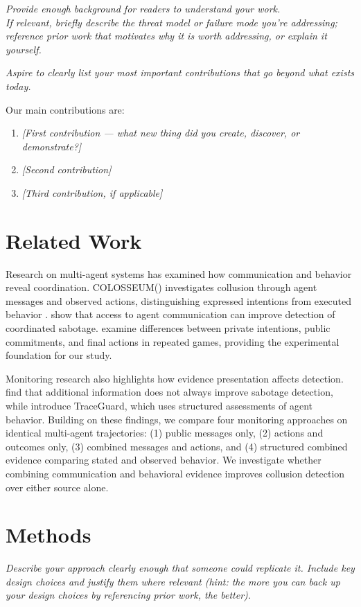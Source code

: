 \documentclass[11pt,a4paper]{article}
\newcommand{\guidance}[1]{\textit{#1}}
\begin{document}
\guidance{Provide enough background for readers to understand your work.\\
If relevant, briefly describe the threat model or failure mode you're addressing; reference prior work that motivates why it is worth addressing, or explain it yourself.}

\guidance{Aspire to clearly list your most important contributions that go beyond what exists today.}

Our main contributions are:
\begin{enumerate}
\item \guidance{[First contribution --- what new thing did you create, discover, or demonstrate?]}
\item \guidance{[Second contribution]}
\item \guidance{[Third contribution, if applicable]}
\end{enumerate}

\section{Related Work}
Research on multi-agent systems has examined how communication and behavior reveal coordination. COLOSSEUM(\cite{nakamura2026colosseum}) investigates collusion through agent messages and observed actions, distinguishing expressed intentions from executed behavior . \cite{radev2026best} show that access to agent communication can improve detection of coordinated sabotage. \cite{shi2026agents} examine differences between private intentions, public commitments, and final actions in repeated games, providing the experimental foundation for our study.

Monitoring research also highlights how evidence presentation affects detection. \cite{arike2026does} find that additional information does not always improve sabotage detection, while \cite{nguyen2026traceguard} introduce TraceGuard, which uses structured assessments of agent behavior. Building on these findings, we compare four monitoring approaches on identical multi-agent trajectories: (1) public messages only, (2) actions and outcomes only, (3) combined messages and actions, and (4) structured combined evidence comparing stated and observed behavior. We investigate whether combining communication and behavioral evidence improves collusion detection over either source alone.

\section{Methods}
\guidance{Describe your approach clearly enough that someone could replicate it. Include key design choices and justify them where relevant (hint: the more you can back up your design choices by referencing prior work, the better).}
\end{document}
